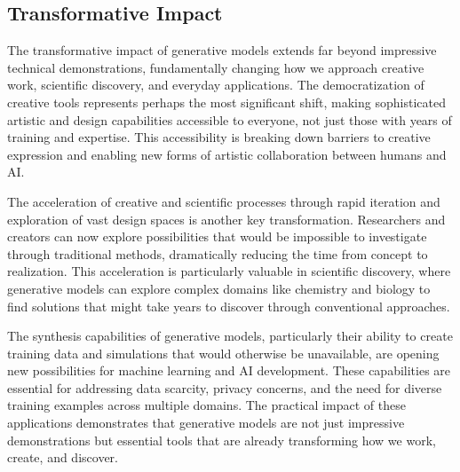 \subsection{Transformative Impact}

The transformative impact of generative models extends far beyond impressive technical demonstrations, fundamentally changing how we approach creative work, scientific discovery, and everyday applications. The democratization of creative tools represents perhaps the most significant shift, making sophisticated artistic and design capabilities accessible to everyone, not just those with years of training and expertise. This accessibility is breaking down barriers to creative expression and enabling new forms of artistic collaboration between humans and AI.

The acceleration of creative and scientific processes through rapid iteration and exploration of vast design spaces is another key transformation. Researchers and creators can now explore possibilities that would be impossible to investigate through traditional methods, dramatically reducing the time from concept to realization. This acceleration is particularly valuable in scientific discovery, where generative models can explore complex domains like chemistry and biology to find solutions that might take years to discover through conventional approaches.

The synthesis capabilities of generative models, particularly their ability to create training data and simulations that would otherwise be unavailable, are opening new possibilities for machine learning and AI development. These capabilities are essential for addressing data scarcity, privacy concerns, and the need for diverse training examples across multiple domains. The practical impact of these applications demonstrates that generative models are not just impressive demonstrations but essential tools that are already transforming how we work, create, and discover.

